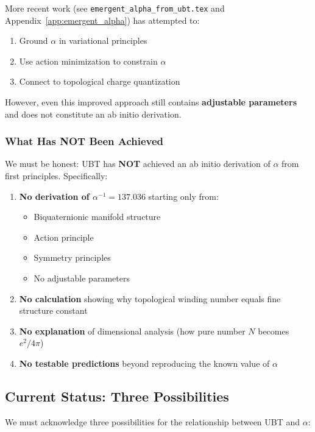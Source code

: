 More recent work (see \texttt{emergent\_alpha\_from\_ubt.tex} and Appendix~\ref{app:emergent_alpha}) has attempted to:
\begin{enumerate}
\item Ground $\alpha$ in variational principles
\item Use action minimization to constrain $\alpha$
\item Connect to topological charge quantization
\end{enumerate}

However, even this improved approach still contains \textbf{adjustable parameters} and does not constitute an ab initio derivation.

\subsubsection{What Has NOT Been Achieved}

We must be honest: UBT has \textbf{NOT} achieved an ab initio derivation of $\alpha$ from first principles. Specifically:

\begin{enumerate}
\item \textbf{No derivation of $\alpha^{-1} = 137.036$} starting only from:
   \begin{itemize}
   \item Biquaternionic manifold structure
   \item Action principle
   \item Symmetry principles
   \item No adjustable parameters
   \end{itemize}

\item \textbf{No calculation} showing why topological winding number equals fine structure constant

\item \textbf{No explanation} of dimensional analysis (how pure number $N$ becomes $e^2/4\pi$)

\item \textbf{No testable predictions} beyond reproducing the known value of $\alpha$
\end{enumerate}

\subsection{Current Status: Three Possibilities}

We must acknowledge three possibilities for the relationship between UBT and $\alpha$:

